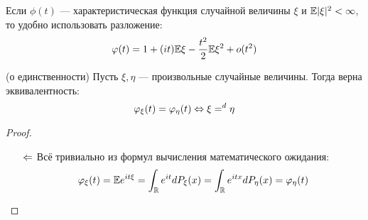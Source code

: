 \begin{corollary}
	Если $\phi(t)$ --- характеристическая функция случайной величины $\xi$ и $\mathbb{E}|\xi|^2 < \infty$, то удобно использовать разложение:
	\[
		\varphi(t) = 1 + (it)\mathbb{E}\xi - \frac{t^2}{2}\mathbb{E}\xi^2 + o(t^2)
	\]
\end{corollary}

\begin{theorem} (о единственности)
	Пусть $\xi, \eta$ --- произвольные случайные величины. Тогда верна эквивалентность:
	\[
		\varphi_\xi(t) = \varphi_\eta(t) \Leftrightarrow \xi =^d \eta
	\]
\end{theorem}

\begin{proof}~
	\begin{itemize}
		\item[$\Leftarrow$] Всё тривиально из формул вычисления математического ожидания:
		\[
			\varphi_\xi(t) = \mathbb{E} e^{it\xi} = \int_{\mathbb{R}} e^{it}dP_\xi(x) = \int_{\mathbb{R}} e^{itx}dP_\eta(x) = \varphi_\eta(t)
		\]
		

\end{itemize}
\end{proof}

